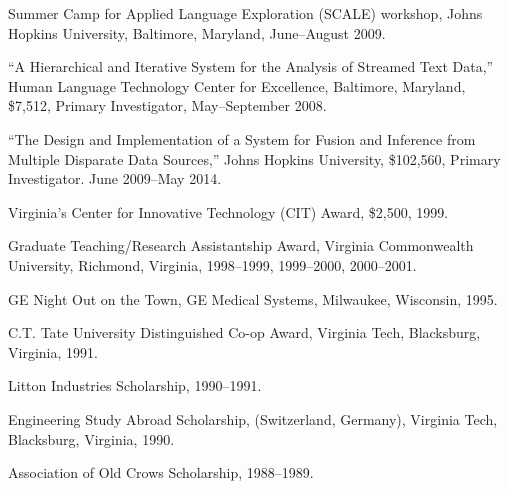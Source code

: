 \documentclass[11pt,article,oneside]{memoir}
\begin{document}
\ind Summer Camp for Applied Language Exploration (SCALE) workshop, Johns Hopkins University, Baltimore, Maryland, June--August 2009.

\ind “A Hierarchical and Iterative System for the Analysis of Streamed Text Data,” Human Language Technology Center for Excellence, Baltimore, Maryland, \$7,512, Primary Investigator, May--September 2008.

\ind “The Design and Implementation of a System for Fusion and Inference from Multiple Disparate Data Sources,” Johns Hopkins University, \$102,560, Primary Investigator.  June 2009--May 2014.

\ind Virginia’s Center for Innovative Technology (CIT) Award, \$2,500, 1999.

\ind Graduate Teaching/Research Assistantship Award, Virginia Commonwealth University, Richmond, Virginia, 1998--1999, 1999--2000, 2000--2001.

\ind GE Night Out on the Town, GE Medical Systems, Milwaukee, Wisconsin, 1995.

\ind C.T. Tate University Distinguished Co-op Award, Virginia Tech, Blacksburg, Virginia, 1991.

\ind Litton Industries Scholarship, 1990--1991.

\ind Engineering Study Abroad Scholarship, (Switzerland, Germany), Virginia Tech, Blacksburg, Virginia, 1990.

\ind Association of Old Crows Scholarship, 1988--1989.






\end{document}
